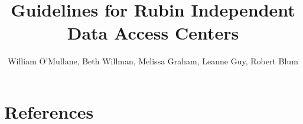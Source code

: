 \documentclass[DM,lsstdraft,authoryear,toc]{lsstdoc}
\title[Independent DACs]{Guidelines for Rubin Independent Data Access Centers}
\author   {William O'Mullane, Beth Willman, Melissa Graham, Leanne Guy, Robert Blum }
\date{\vcsDate}
\begin{document}
\maketitle

\renewcommand{\thepage}{\arabic{page}}%

\setcounter{page}{1}%



%





\appendix
\section{References} \label{sec:bib}
\renewcommand{\refname}{} %


%
\label{sec:acronyms}
\printglossaries



\end{document}
